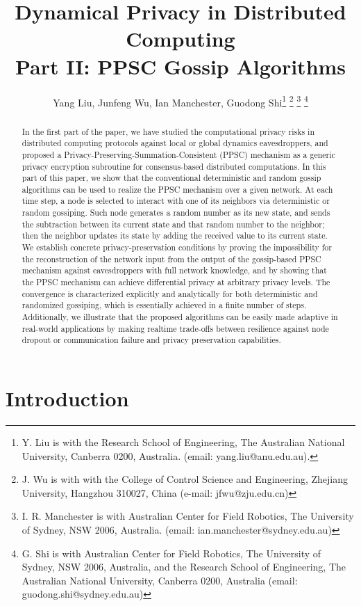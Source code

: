 \documentclass[a4paper, 11pt]{article}
\title{\bf Dynamical Privacy in  Distributed Computing\\
	Part II:  PPSC Gossip Algorithms}
\date{}
\author{Yang Liu, Junfeng Wu, Ian Manchester, Guodong Shi\thanks{Y. Liu is with the Research School of Engineering, The Australian National University, Canberra 0200, Australia. (email: yang.liu@anu.edu.au).}%
\thanks{J. Wu is with   with the College of Control Science and Engineering, Zhejiang
University, Hangzhou 310027, China (e-mail: jfwu@zju.edu.cn)}%
\thanks{I. R. Manchester is with Australian Center for Field Robotics, The University of Sydney, NSW 2006, Australia. (email: ian.manchester@sydney.edu.au)}%
\thanks{G. Shi is with Australian Center for Field Robotics, The University of Sydney, NSW 2006, Australia, and the Research School of Engineering, The Australian National University, Canberra 0200, Australia (email: guodong.shi@sydney.edu.au)}
 }
\newcommand{\1}{\mathbf{1}}
\begin{document}
\maketitle

\begin{abstract}
	In the first part of the paper, we have studied the computational privacy risks in distributed computing protocols against local or global dynamics eavesdroppers, and proposed   a Privacy-Preserving-Summation-Consistent (PPSC) mechanism   as a    generic privacy encryption subroutine for  consensus-based distributed computations.  In this part of this paper, we show that the conventional deterministic and random  gossip algorithms can be used to realize the PPSC mechanism over a given network. At each time step, a node is selected to interact with one of its neighbors via deterministic or random gossiping. Such node generates a random number as its new state,  and  sends the subtraction between its current state and that random number to the neighbor; then the neighbor updates its state by adding the received value to its current state. We establish  concrete privacy-preservation conditions by proving the impossibility  for the reconstruction of the network input from the output of the gossip-based  PPSC mechanism against eavesdroppers with full network knowledge, and by showing  that the PPSC mechanism can achieve differential privacy at arbitrary privacy levels.  The convergence is characterized  explicitly and analytically for both deterministic and randomized gossiping, which is essentially achieved in a finite number of steps. Additionally, we illustrate that the proposed algorithms can be easily made adaptive in real-world applications by making realtime trade-offs between resilience against  node dropout or communication failure and privacy preservation  capabilities.
\end{abstract}

\section{Introduction}
\end{document}
